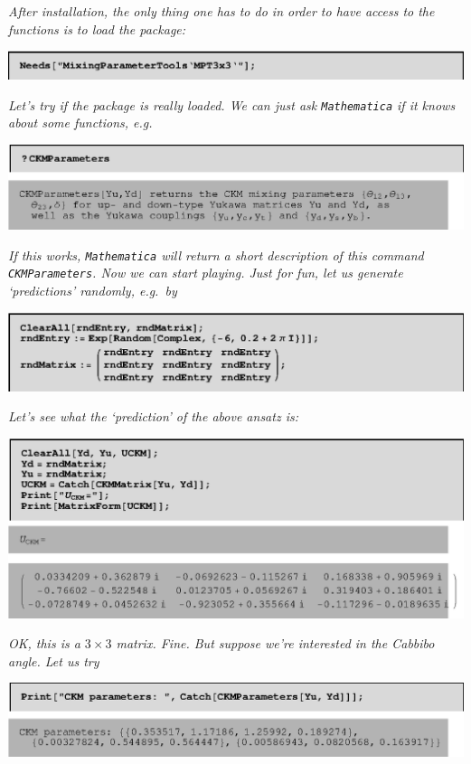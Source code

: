\documentclass[12pt,a4paper,twoside]{scrartcl}
\numberwithin{equation}{section}
\numberwithin{table}{section}
\def\Mathematica{\texttt{Mathematica}}
\begin{document}
{\it
After installation, the only thing one has to do in order to have access to the
functions is to load the package:}
\begin{center}
\includegraphics{MPTdoc1.eps}
\end{center}
{\it
Let's try if the package is really loaded. We can just ask \Mathematica{}
if it knows about some functions, e.g.\ }
\begin{center}
\includegraphics{MPTdoc2.eps}
\end{center}
{\it 
If this works, \Mathematica{} will return a short description of this
command \texttt{CKMParameters}. Now we can start playing. Just for fun, let us
generate `predictions' randomly,
e.g.\ by}
\begin{center}
\includegraphics{MPTdoc3.eps}
\end{center}
{\it Let's see what the `prediction' of the above ansatz is:}
\begin{center}
\includegraphics{MPTdoc4.eps}
\end{center}
{\it 
OK, this is a $3\times3$ matrix. Fine. But suppose we're interested in the
Cabbibo angle. Let us try}
\begin{center}
\includegraphics{MPTdoc5.eps}
\end{center}
\end{document}
